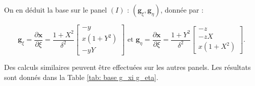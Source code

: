 On en déduit la base sur le panel $(I)$ : $\left( \mathbf{g}_{\xi}, \mathbf{g}_{\eta} \right)$, donnée par :

\begin{equation}
\mathbf{g}_{\xi} = \dfrac{\partial \mathbf{x}}{\partial \xi}= \dfrac{1+X^2}{\delta^2} \begin{bmatrix}
-y \\ x(1+Y^2) \\ -yY
\end{bmatrix} \text{ et } \mathbf{g}_{\eta} = \dfrac{\partial \mathbf{x}}{\partial \xi}= \dfrac{1+Y^2}{\delta^2} \begin{bmatrix}
-z \\ -zX \\ x(1+X^2)
\end{bmatrix} .
\label{eq: base locale I}
\end{equation}

Des calculs similaires peuvent être effectuées sur les autres panels. Les résultats sont donnés dans la Table \ref{tab: base g_xi g_eta}.

